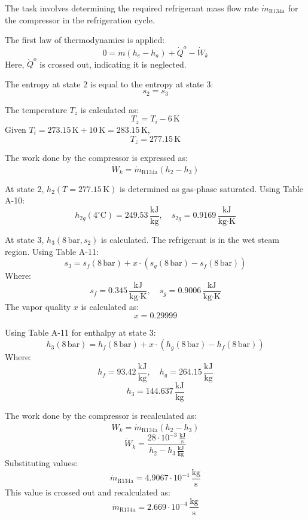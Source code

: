 The task involves determining the required refrigerant mass flow rate \( \dot{m}_{\text{R134a}} \) for the compressor in the refrigeration cycle.

The first law of thermodynamics is applied:  
\[
0 = \dot{m}(h_e - h_a) + \dot{Q}^o - \dot{W}_k
\]  
Here, \( \dot{Q}^o \) is crossed out, indicating it is neglected.

The entropy at state 2 is equal to the entropy at state 3:  
\[
s_2 = s_3
\]

The temperature \( T_z \) is calculated as:  
\[
T_z = T_i - 6 \, \text{K}
\]  
Given \( T_i = 273.15 \, \text{K} + 10 \, \text{K} = 283.15 \, \text{K} \),  
\[
T_z = 277.15 \, \text{K}
\]

The work done by the compressor is expressed as:  
\[
\dot{W}_k = \dot{m}_{\text{R134a}} (h_2 - h_3)
\]

At state 2, \( h_2(T = 277.15 \, \text{K}) \) is determined as gas-phase saturated. Using Table A-10:  
\[
h_{2g}(4^\circ\text{C}) = 249.53 \, \frac{\text{kJ}}{\text{kg}}, \quad s_{2g} = 0.9169 \, \frac{\text{kJ}}{\text{kg·K}}
\]

At state 3, \( h_3(8 \, \text{bar}, s_2) \) is calculated. The refrigerant is in the wet steam region. Using Table A-11:  
\[
s_3 = s_f(8 \, \text{bar}) + x \cdot (s_g(8 \, \text{bar}) - s_f(8 \, \text{bar}))
\]  
Where:  
\[
s_f = 0.345 \, \frac{\text{kJ}}{\text{kg·K}}, \quad s_g = 0.9006 \, \frac{\text{kJ}}{\text{kg·K}}
\]  
The vapor quality \( x \) is calculated as:  
\[
x = 0.29999
\]

Using Table A-11 for enthalpy at state 3:  
\[
h_3(8 \, \text{bar}) = h_f(8 \, \text{bar}) + x \cdot (h_g(8 \, \text{bar}) - h_f(8 \, \text{bar}))
\]  
Where:  
\[
h_f = 93.42 \, \frac{\text{kJ}}{\text{kg}}, \quad h_g = 264.15 \, \frac{\text{kJ}}{\text{kg}}
\]  
\[
h_3 = 144.637 \, \frac{\text{kJ}}{\text{kg}}
\]

The work done by the compressor is recalculated as:  
\[
\dot{W}_k = \dot{m}_{\text{R134a}} (h_2 - h_3)
\]  
\[
\dot{W}_k = \frac{28 \cdot 10^{-3} \, \frac{\text{kJ}}{\text{s}}}{h_2 - h_3 \, \frac{\text{kJ}}{\text{kg}}}
\]  
Substituting values:  
\[
\dot{m}_{\text{R134a}} = 4.9067 \cdot 10^{-4} \, \frac{\text{kg}}{\text{s}}
\]  
This value is crossed out and recalculated as:  
\[
\dot{m}_{\text{R134a}} = 2.669 \cdot 10^{-4} \, \frac{\text{kg}}{\text{s}}
\]